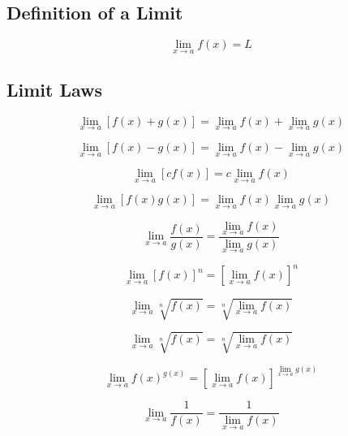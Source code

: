 \documentclass{book}
\begin{document}
\subsection{Definition of a Limit}
\begin{equation}
    \lim_{x \to a} f(x) = L
\end{equation}

\subsection{Limit Laws}
\begin{equation}
    \lim_{x \to a} [f(x) + g(x)] = \lim_{x \to a} f(x) + \lim_{x \to a} g(x)
\end{equation}

\begin{equation}
    \lim_{x \to a} [f(x) - g(x)] = \lim_{x \to a} f(x) - \lim_{x \to a} g(x)
\end{equation}

\begin{equation}
    \lim_{x \to a} [cf(x)] = c \lim_{x \to a} f(x)
\end{equation}

\begin{equation}
    \lim_{x \to a} [f(x)g(x)] = \lim_{x \to a} f(x) \lim_{x \to a} g(x)
\end{equation}

\begin{equation}
    \lim_{x \to a} \frac{f(x)}{g(x)} = \frac{\lim_{x \to a} f(x)}{\lim_{x \to a} g(x)}
\end{equation}

\begin{equation}
    \lim_{x \to a} [f(x)]^n = [\lim_{x \to a} f(x)]^n
\end{equation}

\begin{equation}
    \lim_{x \to a} \sqrt[n]{f(x)} = \sqrt[n]{\lim_{x \to a} f(x)}
\end{equation}

\begin{equation}
    \lim_{x \to a} \sqrt[n]{f(x)} = \sqrt[n]{\lim_{x \to a} f(x)}
\end{equation}

\begin{equation}
    \lim_{x \to a} f(x)^{g(x)} = \left[\lim_{x \to a} f(x)\right]^{\lim_{x \to a} g(x)}
\end{equation}

\begin{equation}
    \lim_{x \to a} \frac{1}{f(x)} = \frac{1}{\lim_{x \to a} f(x)}
\end{equation}
\end{document}
